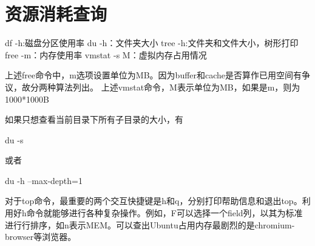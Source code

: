 \section{资源消耗查询}
\begin{shellcmd}
 df -h:磁盘分区使用率
 du -h：文件夹大小
 tree -h:文件夹和文件大小，树形打印
 free -m：内存使用率
 vmstat -s M：虚拟内存占用情况
\end{shellcmd}
上述free命令中，m选项设置单位为MB。因为buffer和cache是否算作已用空间有争议，故分两种算法列出。
 上述vmstat命令，M表示单位为MB，如果是m，则为1000*1000B

如果只想查看当前目录下所有子目录的大小，有
\begin{shellcmd}
du -s
\end{shellcmd}
或者
\begin{shellcmd}
du -h --max-depth=1
\end{shellcmd}

对于top命令，最重要的两个交互快捷键是h和q，分别打印帮助信息和退出top。利用好h命令就能够进行各种复杂操作。例如，F可以选择一个field列，以其为标准进行行排序，如n表示MEM。可以查出Ubuntu占用内存最剧烈的是chromium-browser等浏览器。
 




